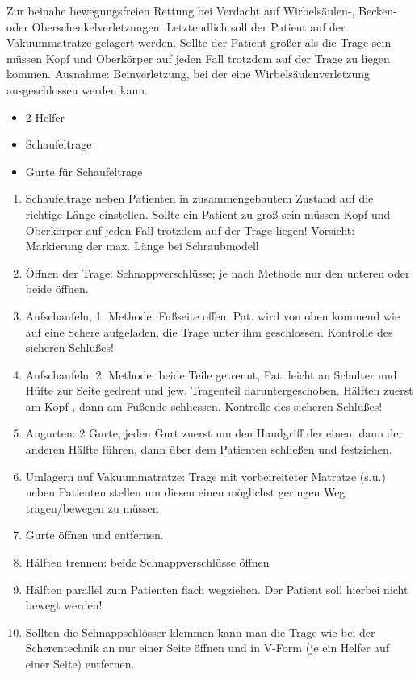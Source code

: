 Zur beinahe bewegungsfreien Rettung bei Verdacht auf Wirbels\"aulen-,
Becken- oder Oberschenkelverletzungen. Letztendlich soll der Patient
auf der Vakuummatratze gelagert werden. Sollte der Patient gr\"o{\ss}er
als die Trage sein m\"ussen Kopf und Oberk\"orper auf jeden Fall
trotzdem auf der Trage zu liegen kommen. Ausnahme: Beinverletzung, bei
der eine Wirbels\"aulenverletzung ausgeschlossen werden kann.


\begin{itemize}
    \item 2 Helfer
    \item Schaufeltrage
    \item Gurte f\"ur Schaufeltrage
\end{itemize}


\begin{enumerate}
    \item Schaufeltrage neben Patienten in zusammengebautem Zustand auf die
    richtige L\"ange einstellen. Sollte ein Patient zu gro{\ss} sein
    m\"ussen Kopf und Oberk\"orper auf jeden Fall trotzdem auf der Trage
    liegen! Vorsicht: Markierung der max. L\"ange bei Schraubmodell
    \item \"Offnen der Trage: Schnappverschl\"usse; je nach Methode nur den
    unteren oder beide \"offnen.
    \item Aufschaufeln, 1. Methode: Fu{\ss}seite offen, Pat. wird von oben
    kommend wie auf eine Schere aufgeladen, die Trage unter ihm
    geschlossen. Kontrolle des sicheren Schlu{\ss}es!
    \item Aufschaufeln: 2. Methode: beide Teile getrennt, Pat. leicht an
    Schulter und H\"ufte zur Seite gedreht und jew. Tragenteil
    daruntergeschoben. H\"alften zuerst am Kopf-, dann am Fu{\ss}ende
    schliessen. Kontrolle des sicheren Schlu{\ss}es!
    \item Angurten: 2 Gurte; jeden Gurt zuerst um den Handgriff der einen,
    dann der anderen H\"alfte f\"uhren, dann \"uber dem Patienten
    schlie{\ss}en und festziehen.
    \item Umlagern auf Vakuummatratze: Trage mit vorbeireiteter Matratze
    (s.u.) neben Patienten stellen um diesen einen m\"oglichst geringen Weg
    tragen/bewegen zu m\"ussen
    \item Gurte \"offnen und entfernen.
    \item H\"alften trennen: beide Schnappverschl\"usse \"offnen
    \item H\"alften parallel zum Patienten flach wegziehen. Der Patient soll
    hierbei nicht bewegt werden!
    \item Sollten die Schnappschl\"osser klemmen kann man die Trage wie bei
    der Scherentechnik an nur einer Seite \"offnen und in V-Form (je ein
    Helfer auf einer Seite) entfernen.
\end{enumerate}




